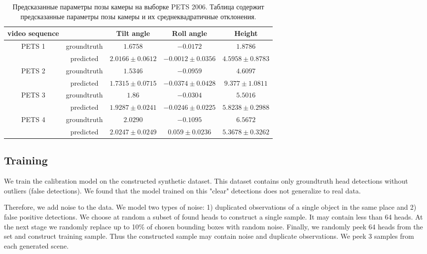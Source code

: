 \begin{table*}[t] 
	\begin{center}
		\captionsetup{width=15cm}
		\caption{Предсказанные параметры позы камеры на выборке PETS 2006. Таблица содержит предсказанные параметры позы камеры и их среднеквадратичные отклонения.} \label{tab:PETS}
		\begin{tabular}{|c|c|c|c|c|} 
			\hline
			video sequence & & Tilt angle & Roll angle & Height \\ \hline \hline
			\multirow{2}{*}{PETS 1} & groundtruth & $1.6758$ & $-0.0172$ & $1.8786$  \\
			& predicted & $2.0166 \pm 0.0612$ & $-0.0012 \pm 0.0356$ &  $4.5958 \pm 0.8783$ \\ \hline
			\multirow{2}{*}{PETS 2} & groundtruth & $1.5346$ & $-0.0959$ & $4.6097$  \\
			& predicted & $1.7315 \pm 0.0715$ & $-0.0374 \pm 0.0428$ &  $9.377 \pm 1.0811$ \\ \hline
			\multirow{2}{*}{PETS 3} & groundtruth & $1.86$ & $-0.0304$ & $5.5016$ \\
			& predicted & $1.9287 \pm 0.0241$ & $-0.0246 \pm 0.0225$ &  $5.8238 \pm 0.2988$ \\ \hline
			\multirow{2}{*}{PETS 4} & groundtruth & $2.0290$ & $-0.1095$ & $6.5672$ \\
			& predicted & $2.0247 \pm 0.0249$ & $0.059 \pm 0.0236$ & $5.3678 \pm 0.3262$ \\ \hline
		\end{tabular}
	\end{center}
\end{table*}

\subsection{Training}

We train the calibration model on the constructed synthetic dataset. This dataset contains only groundtruth head detections without outliers (false detections). We found that the model trained on this "clear" detections does not generalize to real data.

Therefore, we add noise to the data. We model two types of noise: 1) duplicated observations of a single object in the same place and 2) false positive detections. We choose at random a subset of found heads to construct a single sample. It may contain less than 64 heads. At the next stage we randomly replace up to 10\% of chosen bounding boxes with random noise. Finally, we randomly peek 64 heads from the set and construct training sample. Thus the constructed sample may contain noise and duplicate observations. We peek 3 samples from each generated scene.

